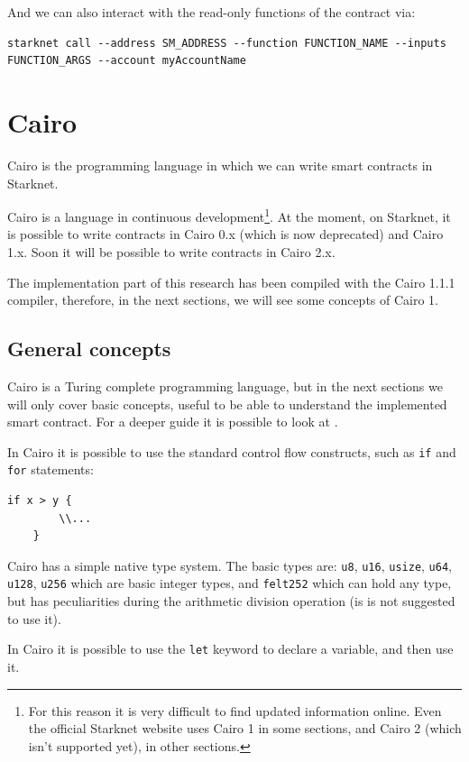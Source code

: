 \documentclass[12pt]{article}
\begin{document}
And we can also interact with the read-only functions of the contract via:
\begin{lstlisting}[language=terminal]
    starknet call --address SM_ADDRESS --function FUNCTION_NAME --inputs FUNCTION_ARGS --account myAccountName
\end{lstlisting}

\section{Cairo} \label{section:cairo}
Cairo is the programming language in which we can write smart contracts in Starknet.

Cairo is a language in continuous development\footnote{For this reason it is very difficult to find updated information online. Even the official Starknet website uses Cairo 1 in some sections, and Cairo 2 (which isn't supported yet), in other sections.}. At the moment, on Starknet, it is possible to write contracts in Cairo 0.x (which is now deprecated) and Cairo 1.x. Soon it will be possible to write contracts in Cairo 2.x.

The implementation part of this research has been compiled with the Cairo 1.1.1 compiler, therefore, in the next sections, we will see some concepts of Cairo 1.

\subsection{General concepts} \label{subsection:general_concepts}
Cairo is a Turing complete programming language, but in the next sections we will only cover basic concepts, useful to be able to understand the implemented smart contract. For a deeper guide it is possible to look at \cite{cairo_documentation}.

In Cairo it is possible to use the standard control flow constructs, such as \verb|if| and \verb|for| statements:
\begin{lstlisting}[language=cairo]
    if x > y {
        \\...
    }
\end{lstlisting} 

Cairo has a simple native type system. The basic types are: \verb|u8|, \verb|u16|, \verb|usize|, \verb|u64|, \verb|u128|, \verb|u256| which are basic integer types, and \verb|felt252| which can hold any type, but has peculiarities during the arithmetic division operation (is is not suggested to use it).

In Cairo it is possible to use the \verb|let| keyword to declare a variable, and then use it.
\end{document}
